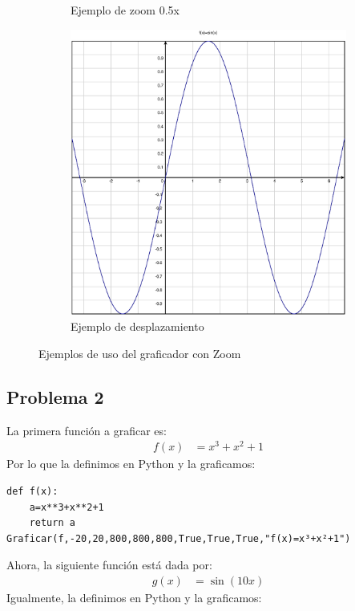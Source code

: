 \documentclass[10pt]{article}
\begin{document}
\begin{figure}[htbp]
\begin{subfigure}[b]{0.3\textwidth}
        \centering
        \caption{Ejemplo de zoom 0.5x}
        \label{im:Seno05x}
    \end{subfigure}
    \hfill
    \begin{subfigure}[b]{0.3\textwidth}
        \includegraphics[width=\textwidth]{figures/SenoCentrado.eps}
        \centering
        \caption{Ejemplo de desplazamiento}
        \label{im:SenoCentrado}
    \end{subfigure}
    \caption{Ejemplos de uso del graficador con Zoom}
\end{figure}
\subsection{Problema 2}
La primera función a graficar es:
\begin{align}
f(x)&=x^3+x^2+1
\end{align}
Por lo que la definimos en Python y la graficamos:

\begin{verbatim}
def f(x):
    a=x**3+x**2+1
    return a
Graficar(f,-20,20,800,800,800,True,True,True,"f(x)=x³+x²+1")
\end{verbatim}

\noindent Ahora, la siguiente función está dada por:
\begin{align}
g(x)&=\sin (10x)
\end{align}
Igualmente, la definimos en Python y la graficamos:
\end{document}
